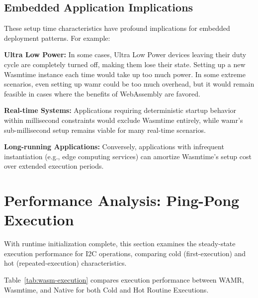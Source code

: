 \subsection{Embedded Application Implications}
\label{subsec:setup-implications}

These setup time characteristics have profound implications for embedded deployment patterns. For example:

\textbf{Ultra Low Power:} In some cases, Ultra Low Power devices leaving their duty cycle are completely turned off, making them lose their state. Setting up a new Wasmtime instance each time would take up too much power. In some extreme scenarios, even setting up \acrshort{wamr} could be too much overhead, but it would remain feasible in cases where the benefits of WebAssembly are favored.

\textbf{Real-time Systems:} Applications requiring deterministic startup behavior within millisecond constraints would exclude Wasmtime entirely, while \acrshort{wamr}'s sub-millisecond setup remains viable for many real-time scenarios.

\textbf{Long-running Applications:} Conversely, applications with infrequent instantiation (e.g., edge computing services) can amortize Wasmtime's setup cost over extended execution periods.

\section{Performance Analysis: Ping-Pong Execution}
\label{sec:eval-execution}

With runtime initialization complete, this section examines the steady-state execution performance for I2C operations, comparing cold (first-execution) and hot (repeated-execution) characteristics.

Table~\ref{tab:wasm-execution} compares execution performance between WAMR, Wasmtime, and Native for both Cold and Hot Routine Executions.

